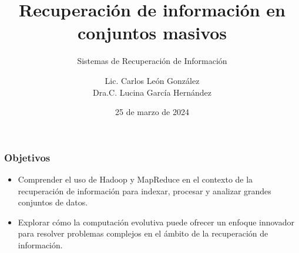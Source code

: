 \documentclass[
10pt, %
aspectratio=169, %
]{beamer}
\title[Short Title]{Recuperación de información en conjuntos masivos}
\subtitle{Sistemas de Recuperación de Información}
\author{Lic. Carlos León González \\ Dra.C. Lucina García Hernández}
\institute[UC]{Facultad de Matem\'atica y Computaci\'on \\ Universidad de La Habana \\ \smallskip }
\date{25 de marzo de  2024} %
\begin{document}
	
	
	
	\begin{frame}
		\titlepage
	\end{frame}
	
	\begin{frame}
		
		\frametitle{Objetivos}
		
		\begin{itemize}
			
			\item Comprender el uso de Hadoop y MapReduce en el contexto de la recuperación de información para indexar, procesar y analizar grandes conjuntos de datos. \\[2mm]
			
			\item Explorar cómo la computación evolutiva puede ofrecer un enfoque innovador para resolver problemas complejos en el ámbito de la recuperación de información. 
			
		\end{itemize}
		
	\end{frame}
	
\end{document}
